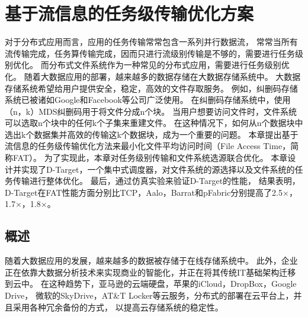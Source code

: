 \chapter{基于流信息的任务级传输优化方案}
\label{cha:erasure_coding}
对于分布式应用而言，应用的任务传输常常包含一系列并行数据流，
常常当所有流传输完成，任务算传输完成，因而只进行流级别传输是不够的，需要进行任务级别优化。
而分布式文件系统作为一种常见的分布式应用，需要进行任务级别优化。
随着大数据应用的部署，越来越多的数据存储在大数据存储系统中。
大数据存储系统希望给用户提供安全，稳定，高效的文件存取服务。
例如，纠删码存储系统已被诸如Google和Facebook等公司广泛使用。
在纠删码存储系统中，使用（n，k）MDS纠删码用于将文件分成n个块。
当用户想要访问文件时，文件系统可以选取n个块中的任何k个子集来重建文件。
在这种情况下，如何从n个数据块中选出k个数据集并高效的传输这k个数据块，成为一个重要的问题。
本章提出基于流信息的任务级传输优化方法来最小化文件平均访问时间（File Access Time，简称FAT）。
为了实现此，本章对任务级别传输和文件系统选源联合优化。
本章设计并实现了D-Target，一个集中式调度器，对文件系统的源选择以及文件系统的任务传输进行整体优化。
最后，通过仿真实验来验证D-Target的性能，
结果表明，D-Target在FAT性能方面分别比TCP，Aalo，Barrat和pFabric分别提高了2.5$\times$，1.7$\times$，1.8$\times$。

\section{概述}
\label{erasure_coding:introduction}
随着大数据应用的发展，越来越多的数据被存储于在线存储系统中。
此外，企业正在依靠大数据分析技术来实现商业的智能化，并正在将其传统IT基础架构迁移到云中。
在这种趋势下，亚马逊的云端硬盘，苹果的iCloud，DropBox，Google Drive，
微软的SkyDrive，AT\&T Locker等云服务，分布式的部署在云平台上，并且采用各种冗余备份的方式，
以提高云存储系统的稳定性。


